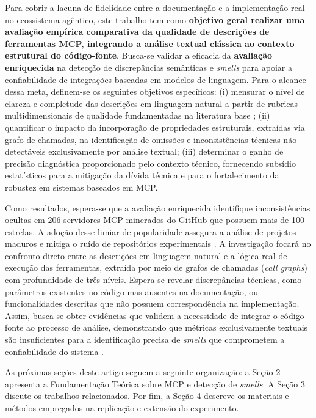 Para cobrir a lacuna de fidelidade entre a documentação e a implementação real no ecossistema agêntico, este trabalho tem como \textbf{objetivo geral realizar uma avaliação empírica comparativa da qualidade de descrições de ferramentas MCP, integrando a análise textual clássica ao contexto estrutural do código-fonte}. Busca-se validar a eficacia da \textbf{avaliação enriquecida} na detecção de discrepâncias semânticas e \textit{smells} para apoiar a confiabilidade de integrações baseadas em modelos de linguagem. Para o alcance dessa meta, definem-se os seguintes objetivos específicos: (i) mensurar o nível de clareza e completude das descrições em linguagem natural a partir de rubricas multidimensionais de qualidade fundamentadas na literatura base \cite{2026arXiv260214878M}; (ii) quantificar o impacto da incorporação de propriedades estruturais, extraídas via grafo de chamadas, na identificação de omissões e inconsistências técnicas não detectáveis exclusivamente por análise textual; (iii) determinar o ganho de precisão diagnóstica proporcionado pelo contexto técnico, fornecendo subsídio estatísticos para a mitigação da dívida técnica e para o fortalecimento da robustez em sistemas baseados em MCP.

Como resultados, espera-se que a avaliação enriquecida identifique inconsistências ocultas em 206 servidores MCP minerados do GitHub que possuem mais de 100 estrelas. A adoção desse limiar de popularidade assegura a análise de projetos maduros e mitiga o ruído de repositórios experimentais \cite{Borges2016, 2026arXiv260214878M}. A investigação focará no confronto direto entre as descrições em linguagem natural e a lógica real de execução das ferramentas, extraída por meio de grafos de chamadas (\textit{call graphs}) com profundidade de três níveis. Espera-se revelar discrepâncias técnicas, como parâmetros existentes no código mas ausentes na documentação, ou funcionalidades descritas que não possuem correspondência na implementação. Assim, busca-se obter evidências que validem a necessidade de integrar o código-fonte ao processo de análise, demonstrando que métricas exclusivamente textuais são insuficientes para a identificação precisa de \textit{smells} que comprometem a confiabilidade do sistema \cite{Taraghi2026}.

As próximas seções deste artigo seguem a seguinte organização: a Seção 2 apresenta a Fundamentação Teórica sobre MCP e detecção de \textit{smells}. A Seção 3 discute os trabalhos relacionados. Por fim, a Seção 4 descreve os materiais e métodos empregados na replicação e extensão do experimento.

